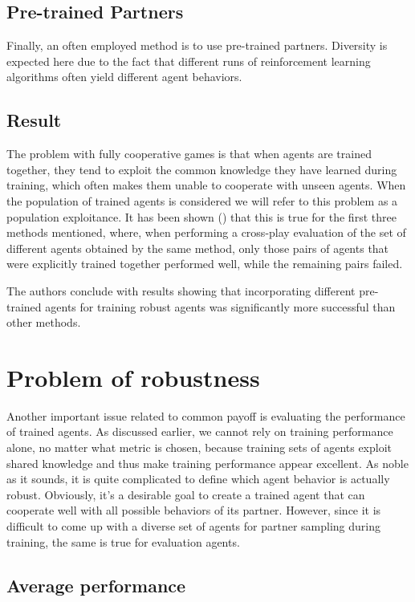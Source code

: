 \subsection{Pre-trained Partners}
Finally, an often employed method is to use pre-trained partners.
Diversity is expected here due to the fact that different runs of reinforcement learning algorithms often yield different agent behaviors.


\subsection{Result}\label{offDiagonalReport}
The problem with fully cooperative games is that when agents are trained together, they tend to exploit the common knowledge they have learned during training, which often makes them unable to cooperate with unseen agents.
When the population of trained agents is considered we will refer to this problem as a population exploitance\label{PopulationExploitance}. 
It has been shown (\cite{10.1007/978-3-030-63823-8_46}) that this is true for the first three methods mentioned, 
where, when performing a cross-play evaluation of the set of different agents obtained by the same method, 
only those pairs of agents that were explicitly trained together performed well, while the remaining pairs failed.

The authors conclude with results showing that incorporating different pre-trained agents for training robust agents was significantly more successful than other methods.


\section{Problem of robustness}\label{RobustnessEvaluation}
Another important issue related to common payoff is evaluating the performance of trained agents.
As discussed earlier, we cannot rely on training performance alone, no matter what metric is chosen, because training sets of agents exploit shared knowledge and thus make training performance appear excellent.
As noble as it sounds, it is quite complicated to define which agent behavior is actually robust.
Obviously, it's a desirable goal to create a trained agent that can cooperate well with all possible behaviors of its partner.
However, since it is difficult to come up with a diverse set of agents for partner sampling during training, the same is true for evaluation agents.

\subsection{Average performance}

